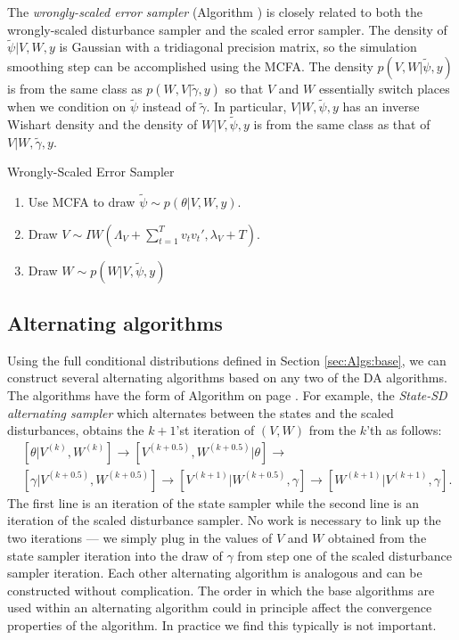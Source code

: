 \documentclass[12pt]{article}
\begin{document}
The {\it wrongly-scaled error sampler} (Algorithm ) is closely related to both the wrongly-scaled disturbance sampler and the scaled error sampler. The density of $\tilde{\psi}|V,W,y$ is Gaussian with a tridiagonal precision matrix, so the simulation smoothing step can be accomplished using the MCFA. The density $p(V,W|\tilde{\psi},y)$ is from the same class as $p(W,V|\tilde{\gamma},y)$ so that $V$ and $W$ essentially switch places when we condition on $\tilde{\psi}$ instead of $\tilde{\gamma}$. In particular, $V|W,\tilde{\psi},y$ has an inverse Wishart density and the density of $W|V,\tilde{\psi},y$ is from the same class as that of $V|W,\tilde{\gamma},y$.
\begin{alg*}[WSE]Wrongly-Scaled Error Sampler\label{alg:DLMwerror}
\begin{enumerate}
\item Use MCFA to draw $\tilde{\psi} \sim p(\theta|V,W,y)$.
\item Draw $V \sim IW\left(\Lambda_V + \sum_{t=1}^Tv_tv_t',\lambda_V + T\right)$.
\item Draw $W \sim p(W|V,\tilde{\psi},y)$
\end{enumerate}
\end{alg*}

\subsection{Alternating algorithms}\label{sec:Algs:alt}
Using the full conditional distributions defined in Section \ref{sec:Algs:base}, we can construct several alternating algorithms based on any two of the DA algorithms. The algorithms have the form of Algorithm  on page \pageref{alg:Alt}. For example, the {\it State-SD alternating sampler} which alternates between the states and the scaled disturbances, obtains the $k+1$'st iteration of $(V,W)$ from the $k$'th as follows:
\begin{align*}
&[\theta|V^{(k)},W^{(k)}] \to [V^{(k+0.5)},W^{(k+0.5)}|\theta] \to\\
&[\gamma|V^{(k+0.5)},W^{(k+0.5)}] \to [V^{(k+1)}|W^{(k+0.5)},\gamma] \to [W^{(k+1)}|V^{(k+1)},\gamma].
\end{align*}
The first line is an iteration of the state sampler while the second line is an iteration of the scaled disturbance sampler. No work is necessary to link up the two iterations --- we simply plug in the values of $V$ and $W$ obtained from the state sampler iteration into the draw of $\gamma$ from step one of the scaled disturbance sampler iteration. Each other alternating algorithm is analogous and can be constructed without complication. The order in which the base algorithms are used within an alternating algorithm could in principle affect the convergence properties of the algorithm. In practice we find this typically is not important. 
\end{document}
